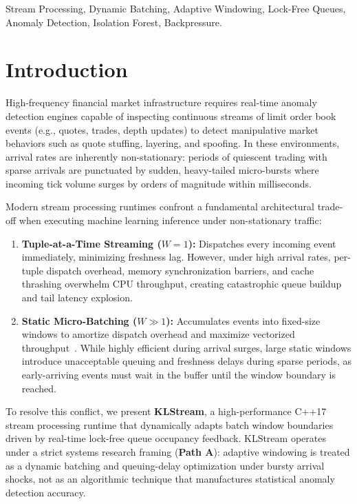 \documentclass[conference,10pt]{IEEEtran}
\begin{document}
\begin{IEEEkeywords}
Stream Processing, Dynamic Batching, Adaptive Windowing, Lock-Free Queues, Anomaly Detection, Isolation Forest, Backpressure.
\end{IEEEkeywords}

\section{Introduction}
High-frequency financial market infrastructure requires real-time anomaly detection engines capable of inspecting continuous streams of limit order book events (e.g., quotes, trades, depth updates) to detect manipulative market behaviors such as quote stuffing, layering, and spoofing. In these environments, arrival rates are inherently non-stationary: periods of quiescent trading with sparse arrivals are punctuated by sudden, heavy-tailed micro-bursts where incoming tick volume surges by orders of magnitude within milliseconds.

Modern stream processing runtimes confront a fundamental architectural trade-off when executing machine learning inference under non-stationary traffic:
\begin{enumerate}
    \item \textbf{Tuple-at-a-Time Streaming ($W = 1$):} Dispatches every incoming event immediately, minimizing freshness lag. However, under high arrival rates, per-tuple dispatch overhead, memory synchronization barriers, and cache thrashing overwhelm CPU throughput, creating catastrophic queue buildup and tail latency explosion.
    \item \textbf{Static Micro-Batching ($W \gg 1$):} Accumulates events into fixed-size windows to amortize dispatch overhead and maximize vectorized throughput~\cite{zaharia2013discretized,carbone2015apache}. While highly efficient during arrival surges, large static windows introduce unacceptable queuing and freshness delays during sparse periods, as early-arriving events must wait in the buffer until the window boundary is reached.
\end{enumerate}

To resolve this conflict, we present \textbf{KLStream}, a high-performance C++17 stream processing runtime that dynamically adapts batch window boundaries driven by real-time lock-free queue occupancy feedback. KLStream operates under a strict systems research framing (\textbf{Path A}): adaptive windowing is treated as a dynamic batching and queuing-delay optimization under bursty arrival shocks, not as an algorithmic technique that manufactures statistical anomaly detection accuracy.
\end{document}
